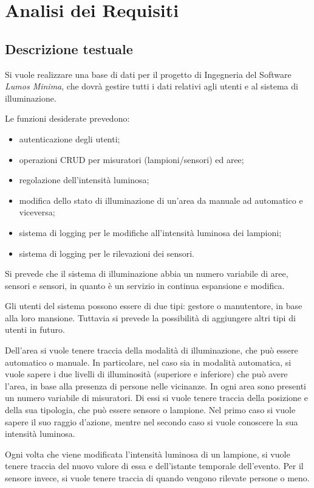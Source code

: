 \chapter{Analisi dei Requisiti}

\section{Descrizione testuale}
Si vuole realizzare una base di dati per il progetto di Ingegneria del Software \textit{Lumos Minima}, che dovrà gestire tutti i dati relativi agli utenti e al sistema di illuminazione.

Le funzioni desiderate prevedono:
\begin{itemize}
    \item autenticazione degli utenti;
    \item operazioni CRUD per misuratori (lampioni/sensori) ed aree;
    \item regolazione dell'intensità luminosa;
    \item modifica dello stato di illuminazione di un'area da manuale ad automatico e viceversa;
    \item sistema di logging per le modifiche all'intensità luminosa dei lampioni;
    \item sistema di logging per le rilevazioni dei sensori.
\end{itemize}

Si prevede che il sistema di illuminazione abbia un numero variabile di aree, sensori e sensori, in quanto è un servizio in continua espansione e modifica.

Gli utenti del sistema possono essere di due tipi: gestore o manutentore, in base alla loro mansione. Tuttavia si prevede la possibilità di aggiungere altri tipi di utenti in futuro.

Dell'area si vuole tenere traccia della modalità di illuminazione, che può essere automatico o manuale. In particolare, nel caso sia in modalità automatica, si vuole sapere i due livelli di illuminosità (superiore e inferiore) che può avere l'area, in base alla presenza di persone nelle vicinanze.
In ogni area sono presenti un numero variabile di misuratori. Di essi si vuole tenere traccia della posizione e della sua tipologia, che può essere sensore o lampione. Nel primo caso si vuole sapere il suo raggio d'azione, mentre nel secondo caso si vuole conoscere la sua intensità luminosa.

Ogni volta che viene modificata l'intensità luminosa di un lampione, si vuole tenere traccia del nuovo valore di essa e dell'istante temporale dell'evento.
Per il sensore invece, si vuole tenere traccia di quando vengono rilevate persone o meno.